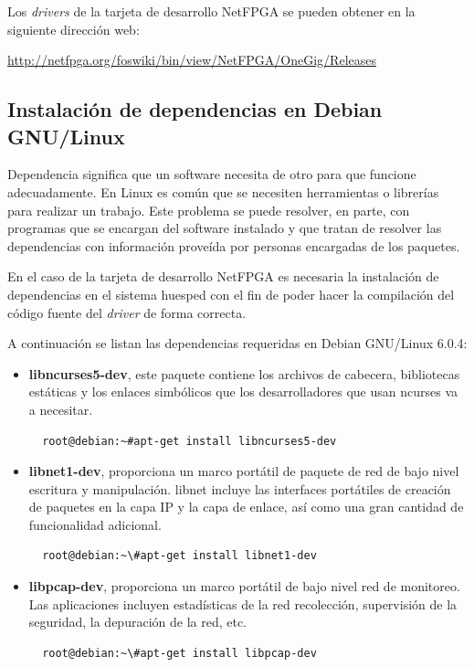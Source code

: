 Los \emph{drivers} de la tarjeta de desarrollo NetFPGA se pueden obtener en la
siguiente dirección web:

\url{http://netfpga.org/foswiki/bin/view/NetFPGA/OneGig/Releases}

\subsection{Instalación de dependencias en Debian GNU/Linux}

Dependencia significa que un software necesita de otro para que funcione
adecuadamente. En Linux es común que se necesiten herramientas o librerías para
realizar un trabajo. Este problema se puede resolver, en parte, con programas
que se encargan del software instalado y que tratan de resolver las dependencias
con información proveída por personas encargadas de los paquetes.

En el caso de la tarjeta de desarrollo NetFPGA es necesaria la instalación de
dependencias en el sistema huesped con el fin de poder hacer la compilación del
código fuente del \emph{driver} de forma correcta.

A continuación se listan las dependencias requeridas en Debian GNU/Linux 6.0.4:

\begin{itemize}
 \item \textbf{libncurses5-dev}, este paquete contiene los archivos de
cabecera, bibliotecas estáticas y los enlaces simbólicos que los desarrolladores
que usan ncurses va a necesitar.\\

  \begin{verbatim}
  root@debian:~#apt-get install libncurses5-dev
  \end{verbatim}

 \item \textbf{libnet1-dev}, proporciona un marco portátil de paquete de red de
bajo nivel escritura y manipulación. libnet incluye las interfaces portátiles de
creación de paquetes en la capa IP y la capa de enlace, así como una gran
cantidad de funcionalidad adicional.

  \begin{verbatim}	
  root@debian:~\#apt-get install libnet1-dev
  \end{verbatim}

 \item \textbf{libpcap-dev}, proporciona un marco portátil de bajo nivel
red de monitoreo. Las aplicaciones incluyen estadísticas de la red
recolección, supervisión de la seguridad, la depuración de la red, etc.

  \begin{verbatim}	
  root@debian:~\#apt-get install libpcap-dev
  \end{verbatim}


\end{itemize}


